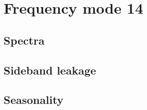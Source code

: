 \section{Frequency mode 14}
\subsection{Spectra}

\subsection{Sideband leakage}

\subsection{Seasonality}

